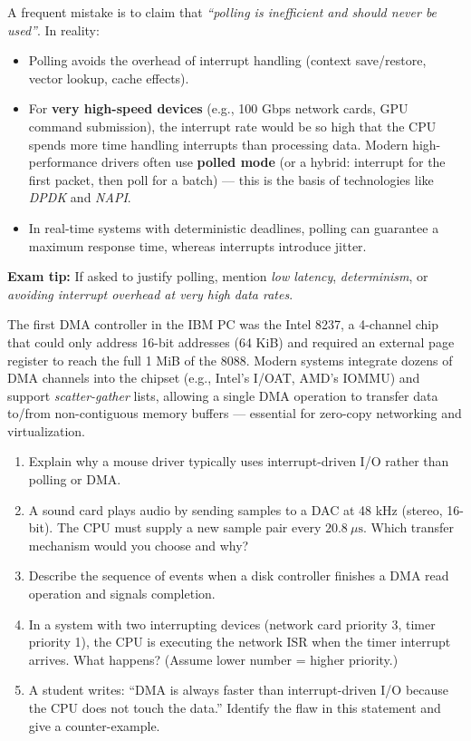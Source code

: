 \documentclass[11pt]{article}
\newcounter{popsec}
\newcounter{popsub}
\newcommand{\courssub}[1]{%
  \stepcounter{popsub}%
  \par\vspace{9pt}\noindent{\popxbold\fontsize{11.5}{13}\selectfont\color{popink}{\color{poporange}\thepopsec.\thepopsub}\hspace{6pt}#1}\par\nopagebreak\vspace{4pt}
}
\begin{document}
\courssub{Common Pitfalls}

\begin{attention}
A frequent mistake is to claim that \emph{``polling is inefficient and should never be used''}. In reality:
\begin{itemize}
\item Polling avoids the overhead of interrupt handling (context save/restore, vector lookup, cache effects).
\item For \textbf{very high-speed devices} (e.g., 100 Gbps network cards, GPU command submission), the interrupt rate would be so high that the CPU spends more time handling interrupts than processing data. Modern high-performance drivers often use \textbf{polled mode} (or a hybrid: interrupt for the first packet, then poll for a batch) — this is the basis of technologies like \emph{DPDK} and \emph{NAPI}.
\item In real-time systems with deterministic deadlines, polling can guarantee a maximum response time, whereas interrupts introduce jitter.
\end{itemize}
\textbf{Exam tip:} If asked to justify polling, mention \emph{low latency}, \emph{determinism}, or \emph{avoiding interrupt overhead at very high data rates}.
\end{attention}

\begin{savaistu}
The first DMA controller in the IBM PC was the Intel 8237, a 4-channel chip that could only address 16-bit addresses (64 KiB) and required an external page register to reach the full 1 MiB of the 8088. Modern systems integrate dozens of DMA channels into the chipset (e.g., Intel's I/OAT, AMD's IOMMU) and support \emph{scatter-gather} lists, allowing a single DMA operation to transfer data to/from non-contiguous memory buffers — essential for zero-copy networking and virtualization.
\end{savaistu}

\begin{exercice}
\begin{enumerate}
\item Explain why a mouse driver typically uses interrupt-driven I/O rather than polling or DMA.
\item A sound card plays audio by sending samples to a DAC at 48 kHz (stereo, 16-bit). The CPU must supply a new sample pair every $20.8\ \mu\mathrm{s}$. Which transfer mechanism would you choose and why?
\item Describe the sequence of events when a disk controller finishes a DMA read operation and signals completion.
\item In a system with two interrupting devices (network card priority 3, timer priority 1), the CPU is executing the network ISR when the timer interrupt arrives. What happens? (Assume lower number = higher priority.)
\item A student writes: ``DMA is always faster than interrupt-driven I/O because the CPU does not touch the data.'' Identify the flaw in this statement and give a counter-example.
\end{enumerate}
\end{exercice}
\end{document}
